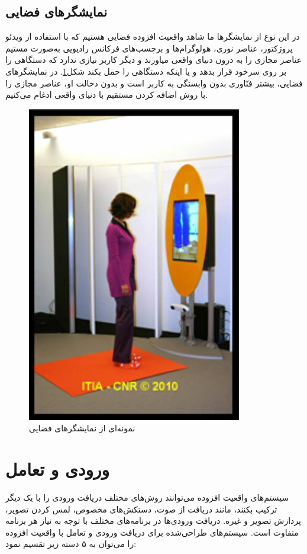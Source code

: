 \subsection{نمایشگرهای فضایی\protect{}}
در این نوع از نمایشگرها ما شاهد واقعیت افزوده فضایی هستیم که با استفاده از ویدئو پروژکتور، عناصر نوری، هولوگرام‌ها و برچسب‌های فرکانس رادیویی به‌صورت مستیم عناصر مجازی را به درون دنیای واقعی میاورند و دیگر کاربر نیازی ندارد که دستگاهی را بر روی سرخود قرار بدهد و یا اینکه دستگاهی را حمل بکند شکل\ref{fig:sar}. در نمایشگرهای فضایی، بیشتر فنّاوری بدون وابستگی به کاربر است و بدون دخالت او، عناصر مجازی را با روش اضافه کردن مستقیم با دنیای واقعی ادغام می‌کنیم\cite{Bimber}.
\begin{figure}[tb]
	\centering
	\includegraphics[width=0.6\linewidth]{image/sar}
	\caption {نمونه‌ای از نمایشگرهای فضایی\cite{Bimber}}
	\label{fig:sar}
\end{figure}
\section{ورودی و تعامل}
سیستم‌های واقعیت افزوده می‌توانند روش‌های مختلف دریافت ورودی را با یک دیگر ترکیب بکنند، مانند دریافت از صوت، دستکش‌های مخصوص، لمس کردن تصویر، پردازش تصویر و غیره. دریافت ورودی‌ها در برنامه‌های مختلف با توجه به نیاز هر برنامه متفاوت است.
سیستم‌های طراحی‌شده برای دریافت ورودی و تعامل با واقعیت افزوده را می‌توان به ۵ دسته زیر تقسیم نمود:

